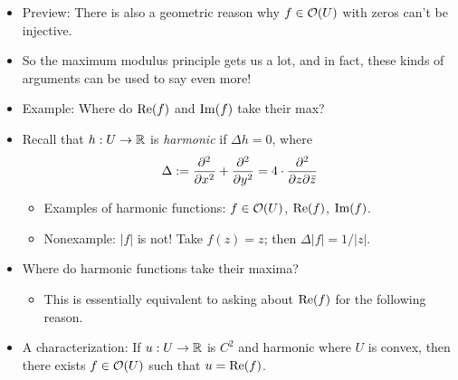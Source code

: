 \documentclass[../notes.tex]{subfiles}
\begin{document}
\begin{itemize}
\begin{enumerate}
\begin{proof}
            Second, we verify that $f^{-1}$ is bounded near any $f(z)\in f(Z)$. To do so, we begin by checking that $f^{-1}:f(U)\to U$ is continuous. Let $X\subset U$ be open. Since $f$ is bijective, $(f^{-1})^{-1}(X)=f(X)$. By the open mapping theorem, $f(X)$ is open. Thus, by the open-set definition of continuity, $f^{-1}$ is continuous, as desired. But then since $f^{-1}$ is continuous, it maps compact sets to compact sets. Therefore, a closed and bounded neighborhood of $f(z)$ will maps to a closed and bounded neighborhood of $z$, as desired.\par
            At this point, we may invoke Riemann's removable singularity theorem to analytically continue $f^{-1}:f(U)\setminus f(Z)\to U\setminus Z$ to $f(U)$. Therefore, since $f:U\to f(U)$ is bijective and holomorphic by hypothesis and $f^{-1}:f(U)\to U$ is holomorphic, $f$ is biholomorphic by definition, as desired.
        \end{proof}
    \end{enumerate}
    \item Preview: There is also a geometric reason why $f\in\mathcal{O}(U)$ with zeros can't be injective.
    \item So the maximum modulus principle gets us a lot, and in fact, these kinds of arguments can be used to say even more!
    \item Example: Where do $\operatorname{Re}(f)$ and $\operatorname{Im}(f)$ take their max?
    \item Recall that $h:U\to\mathbb{R}$ is \emph{harmonic} if $\Delta h=0$, where
    \begin{equation*}
        \Delta := \pdv[2]{x}+\pdv[2]{y}
        = 4\cdot\pdv{}{z}{\bar{z}}
    \end{equation*}
    \begin{itemize}
        \item Examples of harmonic functions: $f\in\mathcal{O}(U)$, $\operatorname{Re}(f)$, $\operatorname{Im}(f)$.
        \item Nonexample: $|f|$ is not! Take $f(z)=z$; then $\Delta|f|=1/|z|$.
    \end{itemize}
    \item Where do harmonic functions take their maxima?
    \begin{itemize}
        \item This is essentially equivalent to asking about $\operatorname{Re}(f)$ for the following reason.
    \end{itemize}
    \item A characterization: If $u:U\to\mathbb{R}$ is $C^2$ and harmonic where $U$ is convex, then there exists $f\in\mathcal{O}(U)$ such that $u=\operatorname{Re}(f)$.

\end{itemize}
\end{document}
